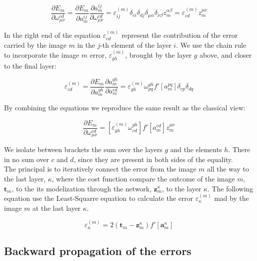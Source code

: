 \documentclass[final, paper=letter,5p,times,twocolumn]{elsarticle}
\begin{document}
\begin{equation}
\frac{\partial E_{m}}{\partial \omega_{\mu \nu}^{cd}} = \frac{\partial E_{m}}{\partial a_{m}^{ij}}\frac{\partial a_{m}^{ij}}{\partial \omega_{\mu \nu}^{cd}} = \varepsilon_{ij}^{(m)}\delta_{ci}\delta_{dj}\delta_{\mu \alpha}\delta_{\nu \beta}z_{m}^{\alpha \beta}  = \varepsilon_{cd}^{(m)}z_{m}^{\mu \nu} 
\end{equation}

In the right end of the equation $\varepsilon_{cd}^{(m)}$ represent the contribution of the error carried by the image $m$ in the $j$-th element of the layer $i$. We use the chain rule to incorporate the image $m$ error, $\varepsilon_{gh}^{(m)}$, brought by the layer $g$ above, and closer to the final layer:

\begin{equation}
\varepsilon_{cd}^{(m)} = \frac{\partial E_{m}}{\partial a_{m}^{gh}}\frac{\partial a_{m}^{gh}}{\partial a_{m}^{cd}} = \varepsilon_{gh}^{(m)} \omega_{pq}^{gh} f'[a_{m}^{pq}] \delta_{cp} \delta_{dq}
\end{equation}

By combining the equations we reproduce the same result as the classical view:

\begin{equation}
\frac{\partial E_{m}}{\partial \omega_{\mu \nu}^{cd}} = \left[ \varepsilon_{gh}^{(m)} \omega_{cd}^{gh} \right] f'[a_{m}^{cd}]  z_{m}^{\mu \nu} 
\end{equation}

We isolate between brackets the sum over the layers $g$ and the elements $h$. There in no sum over $c$ and $d$, since they are present in both sides of the equality. \\
The principal is to iteratively connect the error from the image $m$ all the way to the last layer, $\kappa$, where the cost function compare the outcome of the image $m$, $\bm{t}_{m}$, to the its modelization through the network, $\bm{z}_{m}^{\kappa}$, to the layer $\kappa$. The following equation use the Least-Squarre equation to calculate the error $\varepsilon_{\kappa}^{(m)}$ mad by the image $m$ at the last layer $\kappa$.

\begin{equation}
\varepsilon_{\kappa}^{(m)} = 2\left( \bm{t}_{m} - \bm{z}_{m}^{\kappa}\right)f'[\bm{a}_{m}^{\kappa}]
\end{equation}

\subsection{Backward propagation of the errors}
\end{document}
